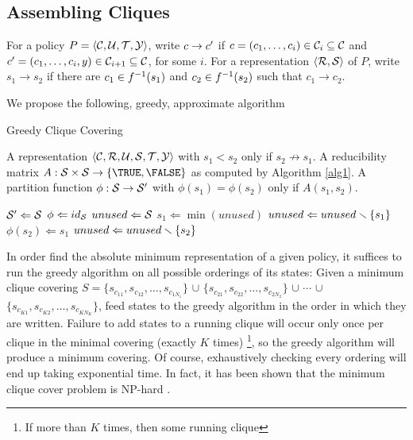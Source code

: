 \subsection{Assembling Cliques}
\begin{notation}
For a policy $P=\ang{\C,\U,\T,\Y}$, 
write $c\to c\1$ if $c=(c_1,\ldots,c_i)\in\C_i\subseteq\C$ and 
$c\1=(c_1,\ldots,c_i,y)\in\C_{i+1}\subseteq\C$, for some $i$.  For a representation $\ang{\R,\S}$ of $P$,
write $s_1\to s_2$ if there are $c_1\in f\inv(s_1)$ and $c_2\in f\inv(s_2)$ such that $c_1\to c_2$.
\end{notation}
We propose the following, greedy, approximate algorithm
\begin{algorithm}                      %
\caption{Greedy Clique Covering}          %
\label{alg2}                           %
\begin{algorithmic}                    %
  \REQUIRE A representation $\ang{\C,\R,\U,\S,\T,\Y}$ with $s_1<s_2$ only if $s_2\not\to s_1$.
  \REQUIRE A reducibility matrix $A:\S\times\S\to\{\TRUE,\FALSE\}$ as computed by Algorithm \ref{alg1}.
  \ENSURE A partition function $\phi:\S\to\S\1$ with $\phi(s_1)=\phi(s_2)$ only if $A(s_1,s_2)$.
  \bigskip
  
  \STATE $\S\1\Leftarrow\S$
  \STATE $\phi\Leftarrow id_{\S}$
  \STATE $unused\Leftarrow\S$
	\STATE $s_1\Leftarrow\min(unused)$
	\STATE $unused\Leftarrow unused\andn\{s_1\}$
		\STATE $\phi(s_2)\Leftarrow s_1$
		\STATE $unused\Leftarrow unused\andn\{s_2\}$
	  \ENDIF
	\ENDFOR
  \ENDWHILE
\end{algorithmic}
\end{algorithm}
In order find the absolute minimum representation of a
given policy, it suffices to run the greedy algorithm on all
possible orderings of its states: 
Given a minimum clique covering 
$S=\{s_{c_{11}}, s_{c_{12}}, \ldots, s_{c_{1 N_1}}\}$
$\cup$
$\{s_{c_{21}}, s_{c_{22}}, \ldots, s_{c_{2 N_2}}\}$
$\cup$ $\cdots$ $\cup$
$\{s_{c_{K1}}, s_{c_{K2}}, \ldots, s_{c_{K N_K}}\}$,
feed states to the greedy algorithm in the order in which they are written.
Failure to add states to a running clique will occur only once per clique in the minimal covering (exactly $K$ times)
\footnote{If more than $K$ times, then some running clique },
so the greedy algorithm will produce a minimum covering.  Of course, 
exhaustively checking every ordering will end up taking exponential time.
In fact, it has been shown that the minimum clique cover problem is NP-hard \cite{karp72}.
